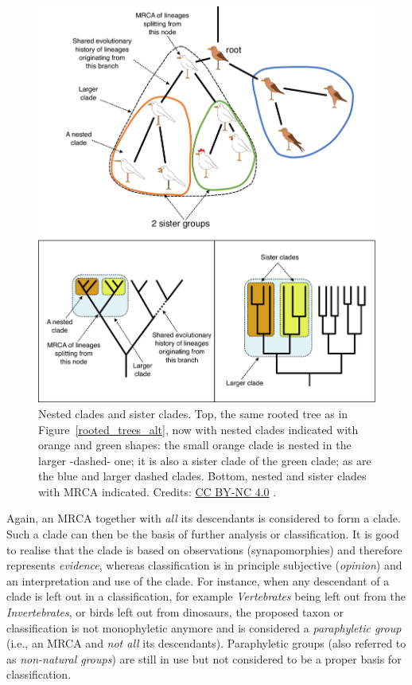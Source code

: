 \begin{figure}[!htbp]
\centering
\includegraphics[width=1\linewidth]{files/nested-clades_alt-56131360ec06dc90e0c4ed033e7b1795.pdf}
\caption[]{Nested clades and sister clades.
Top, the same rooted tree as in Figure~\ref{rooted_trees_alt}, now with nested clades indicated with orange and green shapes: the small orange clade is nested in the larger -dashed- one; it is also a sister clade of the green clade; as are the blue and larger dashed clades.
Bottom, nested and sister clades with MRCA indicated.
Credits: \href{https://creativecommons.org/licenses/by-nc/4.0/}{CC BY-NC 4.0} \cite{own_3_2024}.}
\label{nested_clades_alt}
\end{figure}

Again, an MRCA together with \textit{all} its descendants is considered to form a clade.
Such a clade can then be the basis of further analysis or classification.
It is good to realise that the clade is based on observations (synapomorphies) and therefore represents \textit{evidence}, whereas classification is in principle subjective (\textit{opinion}) and an interpretation and use of the clade.
For instance, when any descendant of a clade is left out in a classification, for example \textit{Vertebrates} being left out from the \textit{Invertebrates}, or birds left out from dinosaurs, the proposed taxon or classification is not monophyletic anymore and is considered a \textit{paraphyletic group} (i.e., an MRCA and \textit{not all} its descendants).
Paraphyletic groups (also referred to as \textit{non-natural groups}) are still in use but not considered to be a proper basis for classification.

